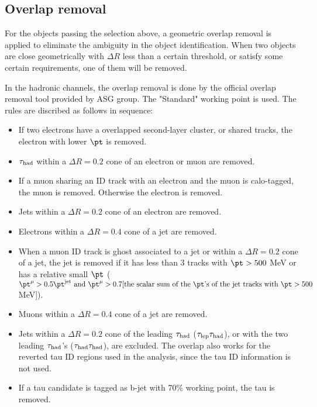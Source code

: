 \subsection{Overlap removal}
For the objects passing the selection above, a geometric overlap removal is applied to eliminate the ambiguity in the object identification.  When two objects are close geometrically with $\Delta R$ less than a certain threshold, or satisfy some certain requirements, one of them will be removed. 

In the hadronic channels, the overlap removal is done by the official overlap removal tool provided by ASG group. The "Standard" working point is used. The rules are discribed as follows in sequence:

\begin{itemize}
\item If two electrons have a overlapped second-layer cluster, or shared tracks, the electron with lower $\pt$ is removed.
\item $\tau_\text{had}$ within a $\Delta R=0.2$ cone of an electron or muon are removed.
\item If a muon sharing an ID track with an electron and the muon is calo-tagged, the muon is removed. Otherwise the electron is removed.
\item Jets within a $\Delta R=0.2$ cone of an electron are removed.
\item Electrons within a $\Delta R=0.4$ cone of a jet are removed.
\item When a muon ID track is ghost associated to a jet or within a $\Delta R=0.2$ cone of a jet, the jet is removed if it has less than 3 tracks with $\pt>500$ MeV or has a relative small $\pt$ ($\pt^{\mu}>0.5\pt^{\text{jet}} \text{ and } \pt^{\mu}>0.7[\text{the scalar sum of the } \pt \text{'s of the jet tracks with } \pt>500$ MeV]).
\item Muons within a $\Delta R=0.4$ cone of a jet are removed.
\item Jets within a $\Delta R=0.2$ cone of the leading $\tau_\text{had}$ ($\tau_\text{lep}{}\tau_\text{had}$), or with the two leading $\tau_\text{had}$'s ($\tau_\text{had}{}\tau_\text{had}$), are excluded. The overlap also works for the reverted tau ID regions used in the analysis, since the tau ID information is not used.
\item If a tau candidate is tagged as b-jet with 70\% working point, the tau is removed.
\end{itemize}

